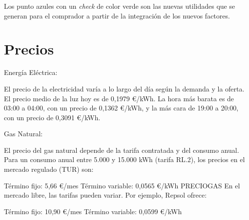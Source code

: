 \documentclass{article}
\begin{document}
Los punto azules con un \textit{check} de color verde son las nuevas utilidades que se generan para el comprador a partir de la integración de los nuevos factores. 
\section{Precios}
Energía Eléctrica:

El precio de la electricidad varía a lo largo del día según la demanda y la oferta. El precio medio de la luz hoy es de 0,1979 €/kWh. La hora más barata es de 03:00 a 04:00, con un precio de 0,1362 €/kWh, y la más cara de 19:00 a 20:00, con un precio de 0,3091 €/kWh. 

Gas Natural:

El precio del gas natural depende de la tarifa contratada y del consumo anual. Para un consumo anual entre 5.000 y 15.000 kWh (tarifa RL.2), los precios en el mercado regulado (TUR) son:

Término fijo: 5,66 €/mes
Término variable: 0,0565 €/kWh 
PRECIOGAS
En el mercado libre, las tarifas pueden variar. Por ejemplo, Repsol ofrece:

Término fijo: 10,90 €/mes
Término variable: 0,0599 €/kWh 
\end{document}

